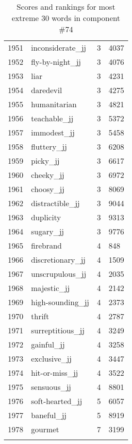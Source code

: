 \begin{longtable}[!htbp]{| rlr@{.}l |}
    1951 & inconsiderate\_jj & 3 & 4037 \\
    1952 & fly-by-night\_jj & 3 & 4076 \\
    1953 & liar & 3 & 4231 \\
    1954 & daredevil & 3 & 4275 \\
    1955 & humanitarian & 3 & 4821 \\
    1956 & teachable\_jj & 3 & 5372 \\
    1957 & immodest\_jj & 3 & 5458 \\
    1958 & fluttery\_jj & 3 & 6208 \\
    1959 & picky\_jj & 3 & 6617 \\
    1960 & cheeky\_jj & 3 & 6972 \\
    1961 & choosy\_jj & 3 & 8069 \\
    1962 & distractible\_jj & 3 & 9044 \\
    1963 & duplicity & 3 & 9313 \\
    1964 & sugary\_jj & 3 & 9776 \\
    1965 & firebrand & 4 & 848 \\
    1966 & discretionary\_jj & 4 & 1509 \\
    1967 & unscrupulous\_jj & 4 & 2035 \\
    1968 & majestic\_jj & 4 & 2142 \\
    1969 & high-sounding\_jj & 4 & 2373 \\
    1970 & thrift & 4 & 2787 \\
    1971 & surreptitious\_jj & 4 & 3249 \\
    1972 & gainful\_jj & 4 & 3258 \\
    1973 & exclusive\_jj & 4 & 3447 \\
    1974 & hit-or-miss\_jj & 4 & 3522 \\
    1975 & sensuous\_jj & 4 & 8801 \\
    1976 & soft-hearted\_jj & 5 & 6057 \\
    1977 & baneful\_jj & 5 & 8919 \\
    1978 & gourmet & 7 & 3199 \\
    \hline
    \caption{Scores and rankings for most extreme 30 words in component \#74} \\
\end{longtable}
